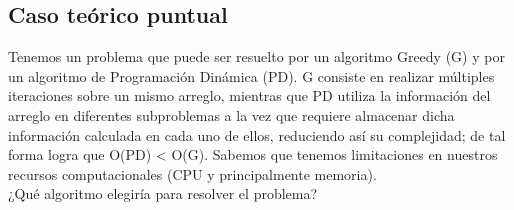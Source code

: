 \documentclass[titlepage,a4paper]{article}
\begin{document}
\newpage\subsection{Caso teórico puntual}\label{sec:parte2_2}
\begin{tcolorbox}[colback=blue!5!white,colframe=blue!75!black,title=Enunciado 2.2]
    Tenemos un problema que puede ser resuelto por un algoritmo Greedy (G) y
    por un algoritmo de Programación Dinámica (PD). G consiste en realizar múltiples
    iteraciones sobre un mismo arreglo, mientras que PD utiliza la información del
    arreglo en diferentes subproblemas a la vez que requiere almacenar dicha
    información calculada en cada uno de ellos, reduciendo así su complejidad;
    de tal forma logra que O(PD) < O(G). Sabemos que tenemos limitaciones en nuestros
    recursos computacionales (CPU y principalmente memoria).\\
    ¿Qué algoritmo elegiría para resolver el problema?
\end{tcolorbox}


\end{document}
